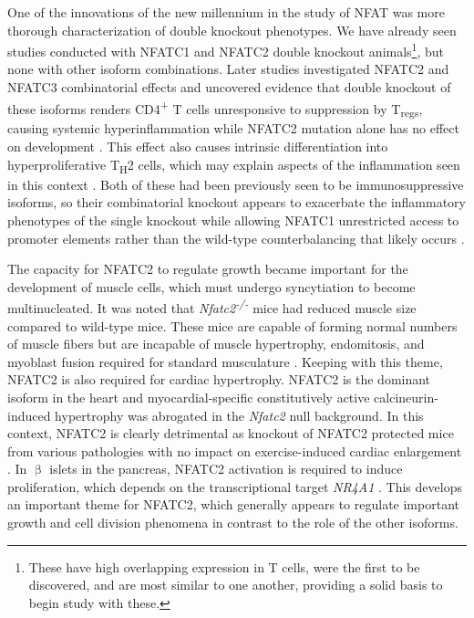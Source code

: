 One of the innovations of the new millennium in the study of NFAT was more thorough characterization of double knockout phenotypes. We have already seen studies conducted with NFATC1 and NFATC2 double knockout animals\footnote{These have high overlapping expression in T cells, were the first to be discovered, and are most similar to one another, providing a solid basis to begin study with these.}, but none with other isoform combinations. Later studies investigated NFATC2 and NFATC3 combinatorial effects and uncovered evidence that double knockout of these isoforms renders CD4\textsuperscript{+} T cells unresponsive to suppression by T\textsubscript{regs}, causing systemic hyperinflammation \citep{Bopp2005} while NFATC2 mutation alone has no effect on development \citep{CanteBarrett2007}. This effect also causes intrinsic differentiation into hyperproliferative T\textsubscript{H}2 cells, which may explain aspects of the inflammation seen in this context \citep{Rengarajan2002, Ranger1998b}. Both of these had been previously seen to be immunosuppressive isoforms, so their combinatorial knockout appears to exacerbate the inflammatory phenotypes of the single knockout \citep{Oukka1998, Hodge1996} while allowing NFATC1 unrestricted access to promoter elements rather than the wild\hyp{}type counterbalancing that likely occurs \citep{Ranger1998b}. 

The capacity for NFATC2 to regulate growth became important for the development of muscle cells, which must undergo syncytiation to become multinucleated. It was noted that \textit{Nfatc2\textsuperscript{\hyp{}/\hyp{}}} mice had reduced muscle size compared to wild\hyp{}type mice. These mice are capable of forming normal numbers of muscle fibers but are incapable of muscle hypertrophy, endomitosis, and myoblast fusion required for standard musculature \citep{Horsley2001, Pavlath2003, Schulze2005}. Keeping with this theme, NFATC2 is also required for cardiac hypertrophy. NFATC2 is the dominant isoform in the heart and myocardial\hyp{}specific constitutively active calcineurin\hyp{}induced hypertrophy was abrogated in the \textit{Nfatc2} null background. In this context, NFATC2 is clearly detrimental as knockout of NFATC2 protected mice from various pathologies with no impact on exercise\hyp{}induced cardiac enlargement \citep{Bourajjaj2008}. In $\upbeta$ islets in the pancreas, NFATC2 activation is required to induce proliferation, which depends on the transcriptional target \textit{NR4A1} \citep{Simonett2021}. This develops an important theme for NFATC2, which generally appears to regulate important growth and cell division phenomena in contrast to the role of the other isoforms.

